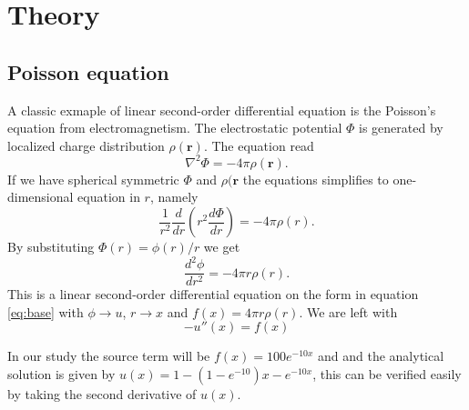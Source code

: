 \documentclass[10pt, a4paper]{amsart}
\begin{document}
\section{Theory}
\subsection{Poisson equation}
A classic exmaple of linear second-order differential equation is the Poisson's equation from electromagnetism. The electrostatic potential $\Phi$ is generated by localized charge distribution $\rho(\mathbf{r}).$ The equation read 
\begin{equation}
	\nabla^2\Phi = -4\pi\rho(\mathbf{r})\nonumber.
\end{equation}
If we have spherical symmetric $\Phi$ and $\rho(\mathbf{r}$ the equations simplifies to one-dimensional equation in $r$, namely 
\begin{equation}
	\frac{1}{r^2}\frac{d}{dr}\left( r^2\frac{d\Phi}{dr}\right) = -4\pi\rho(r).	\nonumber
\end{equation}
By substituting $\Phi(r) = \phi(r)/r$ we get 
\begin{equation}
	\frac{d^2\phi}{dr^2} = -4\pi r\rho(r).\nonumber
\end{equation}
This is a linear second-order differential equation on the form in equation \ref{eq:base} with $\phi \rightarrow u$, $r \rightarrow x$ and $f(x) = 4\pi r\rho(r)$. We are left with
\begin{equation}
	-u''(x) = f(x)\nonumber
\end{equation}

In our study the source term will be $f(x) = 100e^{-10x}$ and and the analytical solution is given by $u(x) = 1-(1-e^{-10})x-e^{-10x}$, this can be verified easily by taking the second derivative of $u(x)$.
\end{document}
